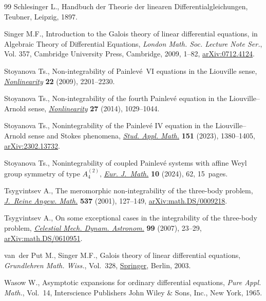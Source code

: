 \documentclass[10pt,a4paper]{amsart}
\providecommand{\LastPageEnding}{}
\numberwithin{equation}{section}
\begin{document}
\begin{thebibliography}{99}
Schlesinger L., Handbuch der {T}heorie der linearen {D}ifferentialgleichungen,
 Teubner, Leipzig, 1897.

Singer M.F., Introduction to the {G}alois theory of linear differential
 equations, in Algebraic Theory of Differential Equations, \textit{London
 Math. Soc. Lecture Note Ser.}, Vol. 357, Cambridge University Press,
 Cambridge, 2009, 1--82, \href{https://arxiv.org/abs/0712.4124}{arXiv:0712.4124}.

Stoyanova Ts., Non-integrability of {P}ainlev\'e~{VI} equations in the
 {L}iouville sense, \href{https://doi.org/10.1088/0951-7715/22/9/008}{\textit{Nonlinearity}} \textbf{22} (2009), 2201--2230.

Stoyanova Ts., Non-integrability of the fourth {P}ainlev\'e equation in the
 {L}iouville--{A}rnold sense, \href{https://doi.org/10.1088/0951-7715/27/5/1029}{\textit{Nonlinearity}} \textbf{27} (2014),
 1029--1044.

Stoyanova Ts., Nonintegrability of the {P}ainlev\'e {IV} equation in the
 {L}iouville--{A}rnold sense and {S}tokes phenomena, \href{https://doi.org/10.1111/sapm.12629}{\textit{Stud. Appl.
 Math.}} \textbf{151} (2023), 1380--1405, \href{https://arxiv.org/abs/2302.13732}{arXiv:2302.13732}.

Stoyanova Ts., Nonintegrability of coupled {P}ainlev\'e systems with affine
 {W}eyl group symmetry of type {$A_4^{(2)}$}, \href{https://doi.org/10.1007/s40879-024-00781-x}{\textit{Eur. J.~Math.}}
 \textbf{10} (2024), 62, 15~pages.

Tsygvintsev A., The meromorphic non-integrability of the three-body problem,
 \href{https://doi.org/10.1515/crll.2001.061}{\textit{J.~Reine Angew. Math.}} \textbf{537} (2001), 127--149,
 \href{https://arxiv.org/abs/math.DS/0009218}{arXiv:math.DS/0009218}.

Tsygvintsev A., On some exceptional cases in the integrability of the
 three-body problem, \href{https://doi.org/10.1007/s10569-007-9086-5}{\textit{Celestial Mech. Dynam. Astronom.}} \textbf{99}
 (2007), 23--29, \href{https://arxiv.org/abs/math.DS/0610951}{arXiv:math.DS/0610951}.

van~der Put M., Singer M.F., Galois theory of linear differential equations,
 \textit{Grundlehren Math. Wiss.}, Vol.~328, \href{https://doi.org/10.1007/978-3-642-55750-7}{Springer}, Berlin, 2003.

Wasow W., Asymptotic expansions for ordinary differential equations,
 \textit{Pure Appl. Math.}, Vol.~14, Interscience Publishers John Wiley \&
 Sons, Inc., New York, 1965.

\end{thebibliography}\LastPageEnding
\end{document}
